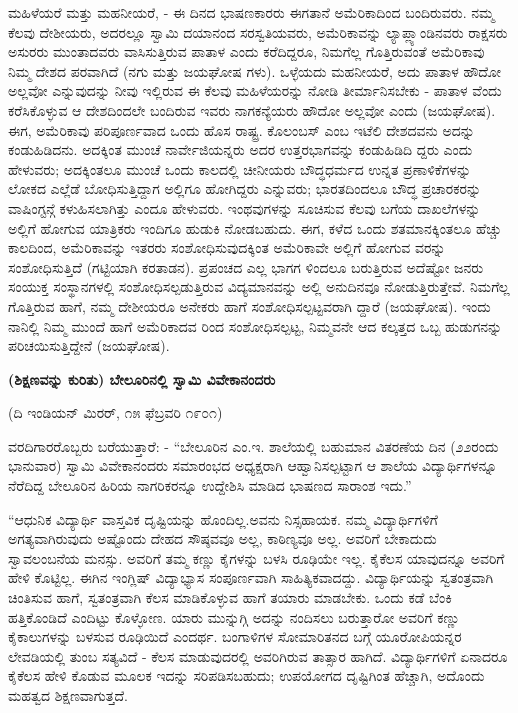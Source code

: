 ಮಹಿಳೆಯರೆ ಮತ್ತು ಮಹನೀಯರೆ, - ಈ ದಿನದ ಭಾಷಣಕಾರರು ಈಗತಾನೆ ಅಮೆರಿಕಾದಿಂದ ಬಂದಿರುವರು. ನಮ್ಮ ಕೆಲವು ದೇಶೀಯರು, ಅದರಲ್ಲೂ ಸ್ವಾಮಿ ದಯಾನಂದ ಸರಸ್ವತಿಯವರು, ಅಮೆರಿಕಾವನ್ನು ಲ್ಯಾಪ್ಲ್ಯಾಂಡಿನವರು ರಾಕ್ಷಸರು ಅಸುರರು ಮುಂತಾದವರು ವಾಸಿಸುತ್ತಿರುವ ಪಾತಾಳ ಎಂದು ಕರೆದಿದ್ದರೂ, ನಿಮಗೆಲ್ಲ ಗೊತ್ತಿರುವಂತೆ ಅಮೆರಿಕಾವು ನಿಮ್ಮ ದೇಶದ ಪರವಾಗಿದೆ (ನಗು ಮತ್ತು ಜಯಘೋಷ ಗಳು). ಒಳ್ಳೆಯದು ಮಹನೀಯರೆ, ಅದು ಪಾತಾಳ ಹೌದೋ ಅಲ್ಲವೋ ಎನ್ನುವುದನ್ನು ನೀವು ಇಲ್ಲಿರುವ ಈ ಕೆಲವು ಮಹಿಳೆಯರನ್ನು ನೋಡಿ ತೀರ್ಮಾನಿಸಬೇಕು - ಪಾತಾಳ ವೆಂದು ಕರೆಸಿಕೊಳ್ಳುವ ಆ ದೇಶದಿಂದಲೇ ಬಂದಿರುವ ಇವರು ನಾಗಕನ್ಯೆಯರು ಹೌದೋ ಅಲ್ಲವೋ ಎಂದು (ಜಯಘೋಷ). ಈಗ, ಅಮೆರಿಕಾವು ಪರಿಪೂರ್ಣವಾದ ಒಂದು ಹೊಸ ರಾಷ್ಟ್ರ. ಕೊಲಂಬಸ್ ಎಂಬ ಇಟೆಲಿ ದೇಶದವನು ಅದನ್ನು ಕಂಡುಹಿಡಿದನು. ಅದಕ್ಕಿಂತ ಮುಂಚೆ ನಾರ್ವೇಜಿಯನ್ನರು ಅದರ ಉತ್ತರಭಾಗವನ್ನು ಕಂಡುಹಿಡಿದಿ ದ್ದರು ಎಂದು ಹೇಳುವರು; ಅದಕ್ಕಿಂತಲೂ ಮುಂಚೆ ಒಂದು ಕಾಲದಲ್ಲಿ ಚೀನೀಯರು ಬೌದ್ಧಧರ್ಮದ ಉನ್ನತ ಪ್ರಣಾಳಿಕೆಗಳನ್ನು ಲೋಕದ ಎಲ್ಲೆಡೆ ಬೋಧಿಸುತ್ತಿದ್ದಾಗ ಅಲ್ಲಿಗೂ ಹೋಗಿದ್ದರು ಎನ್ನುವರು; ಭಾರತದಿಂದಲೂ ಬೌದ್ಧ ಪ್ರಚಾರಕರನ್ನು ವಾಷಿಂಗ್ಟನ್ಗೆ ಕಳುಹಿಸಲಾಗಿತ್ತು ಎಂದೂ ಹೇಳುವರು. ಇಂಥವುಗಳನ್ನು ಸೂಚಿಸುವ ಕೆಲವು ಬಗೆಯ ದಾಖಲೆಗಳನ್ನು ಅಲ್ಲಿಗೆ ಹೋಗುವ ಯಾತ್ರಿಕರು ಇಂದಿಗೂ ಹುಡುಕಿ ನೋಡಬಹುದು. ಈಗ, ಕಳೆದ ಒಂದು ಶತಮಾನಕ್ಕಿಂತಲೂ ಹೆಚ್ಚು ಕಾಲದಿಂದ, ಅಮೆರಿಕಾವನ್ನು ಇತರರು ಸಂಶೋಧಿಸುವುದಕ್ಕಿಂತ ಅಮೆರಿಕಾವೇ ಅಲ್ಲಿಗೆ ಹೋಗುವ ವರನ್ನು ಸಂಶೋಧಿಸುತ್ತಿದೆ (ಗಟ್ಟಿಯಾಗಿ ಕರತಾಡನ). ಪ್ರಪಂಚದ ಎಲ್ಲ ಭಾಗಗ ಳಿಂದಲೂ ಬರುತ್ತಿರುವ ಅದೆಷ್ಟೋ ಜನರು ಸಂಯುಕ್ತ ಸಂಸ್ಥಾನಗಳಲ್ಲಿ ಸಂಶೋಧಿಸಲ್ಪಡುತ್ತಿರುವ ವಿದ್ಯಮಾನವನ್ನು ಅಲ್ಲಿ ಅನುದಿನವೂ ನೋಡುತ್ತಿರುತ್ತೇವೆ. ನಿಮಗೆಲ್ಲ ಗೊತ್ತಿರುವ ಹಾಗೆ, ನಮ್ಮ ದೇಶೀಯರೂ ಅನೇಕರು ಹಾಗೆ ಸಂಶೋಧಿಸಲ್ಪಟ್ಟವರಾಗಿ ದ್ದಾರೆ (ಜಯಘೋಷ). ಇಂದು ನಾನಿಲ್ಲಿ ನಿಮ್ಮ ಮುಂದೆ ಹಾಗೆ ಅಮೆರಿಕಾದವ ರಿಂದ ಸಂಶೋಧಿಸಲ್ಪಟ್ಟ, ನಿಮ್ಮವನೇ ಆದ ಕಲ್ಕತ್ತದ ಒಬ್ಬ ಹುಡುಗನನ್ನು ಪರಿಚಯಿಸುತ್ತಿದ್ದೇನೆ (ಜಯಘೋಷ).

\begin{center}
\textbf{(ಶಿಕ್ಷಣವನ್ನು ಕುರಿತು) ಬೇಲೂರಿನಲ್ಲಿ ಸ್ವಾಮಿ ವಿವೇಕಾನಂದರು}
\end{center}

\begin{center}
(ದಿ ಇಂಡಿಯನ್ ಮಿರರ್, ೧೫ ಫೆಬ್ರವರಿ ೧೯೦೧)
\end{center}

ವರದಿಗಾರರೊಬ್ಬರು ಬರೆಯುತ್ತಾರೆ: - “ಬೇಲೂರಿನ ಎಂ.ಇ. ಶಾಲೆಯಲ್ಲಿ ಬಹುಮಾನ ವಿತರಣೆಯ ದಿನ (೨೨ರಂದು ಭಾನುವಾರ) ಸ್ವಾಮಿ ವಿವೇಕಾನಂದರು ಸಮಾರಂಭದ ಅಧ್ಯಕ್ಷರಾಗಿ ಆಹ್ವಾನಿಸಲ್ಪಟ್ಟಾಗ ಆ ಶಾಲೆಯ ವಿದ್ಯಾರ್ಥಿಗಳನ್ನೂ ನೆರೆದಿದ್ದ ಬೇಲೂರಿನ ಹಿರಿಯ ನಾಗರಿಕರನ್ನೂ ಉದ್ದೇಶಿಸಿ ಮಾಡಿದ ಭಾಷಣದ ಸಾರಾಂಶ ಇದು.”

“ಆಧುನಿಕ ವಿದ್ಯಾರ್ಥಿ ವಾಸ್ತವಿಕ ದೃಷ್ಟಿಯನ್ನು ಹೊಂದಿಲ್ಲ.ಅವನು ನಿಸ್ಸಹಾಯಕ. ನಮ್ಮ ವಿದ್ಯಾರ್ಥಿಗಳಿಗೆ ಅಗತ್ಯವಾಗಿರುವುದು ಅಷ್ಟೊಂದು ದೇಹದ ಸೌಷ್ಠವವೂ ಅಲ್ಲ, ಕಾಠಿಣ್ಯವೂ ಅಲ್ಲ. ಅವರಿಗೆ ಬೇಕಾದುದು ಸ್ವಾವಲಂಬನೆಯ ಮನಸ್ಸು. ಅವರಿಗೆ ತಮ್ಮ ಕಣ್ಣು ಕೈಗಳನ್ನು ಬಳಸಿ ರೂಢಿಯೇ ಇಲ್ಲ. ಕೈಕೆಲಸ ಯಾವುದನ್ನೂ ಅವರಿಗೆ ಹೇಳಿ ಕೊಟ್ಟಿಲ್ಲ. ಈಗಿನ ಇಂಗ್ಲಿಷ್ ವಿದ್ಯಾಭ್ಯಾಸ ಸಂಪೂರ್ಣವಾಗಿ ಸಾಹಿತ್ಯಿಕವಾದದ್ದು. ವಿದ್ಯಾರ್ಥಿಯನ್ನು ಸ್ವತಂತ್ರವಾಗಿ ಚಿಂತಿಸುವ ಹಾಗೆ, ಸ್ವತಂತ್ರವಾಗಿ ಕೆಲಸ ಮಾಡಿಕೊಳ್ಳುವ ಹಾಗೆ ತಯಾರು ಮಾಡಬೇಕು. ಒಂದು ಕಡೆ ಬೆಂಕಿ ಹತ್ತಿಕೊಂಡಿದೆ ಎಂದಿಟ್ಟು ಕೊಳ್ಳೋಣ. ಯಾರು ಮುನ್ನುಗ್ಗಿ ಅದನ್ನು ನಂದಿಸಲು ಬರುತ್ತಾರೋ ಅವರಿಗೆ ಕಣ್ಣು ಕೈಕಾಲುಗಳನ್ನು ಬಳಸುವ ರೂಢಿಯಿದೆ ಎಂದರ್ಥ. ಬಂಗಾಳಿಗಳ ಸೋಮಾರಿತನದ ಬಗ್ಗೆ ಯೂರೋಪಿಯನ್ನರ ಲೇವಡಿಯಲ್ಲಿ ತುಂಬ ಸತ್ಯವಿದೆ - ಕೆಲಸ ಮಾಡುವುದರಲ್ಲಿ ಅವರಿಗಿರುವ ತಾತ್ಸಾರ ಹಾಗಿದೆ. ವಿದ್ಯಾರ್ಥಿಗಳಿಗೆ ಏನಾದರೂ ಕೈಕೆಲಸ ಹೇಳಿ ಕೊಡುವ ಮೂಲಕ ಇದನ್ನು ಸರಿಪಡಿಸಬಹುದು; ಉಪಯೋಗದ ದೃಷ್ಟಿಗಿಂತ ಹೆಚ್ಚಾಗಿ, ಅದೊಂದು ಮಹತ್ವದ ಶಿಕ್ಷಣವಾಗುತ್ತದೆ.

